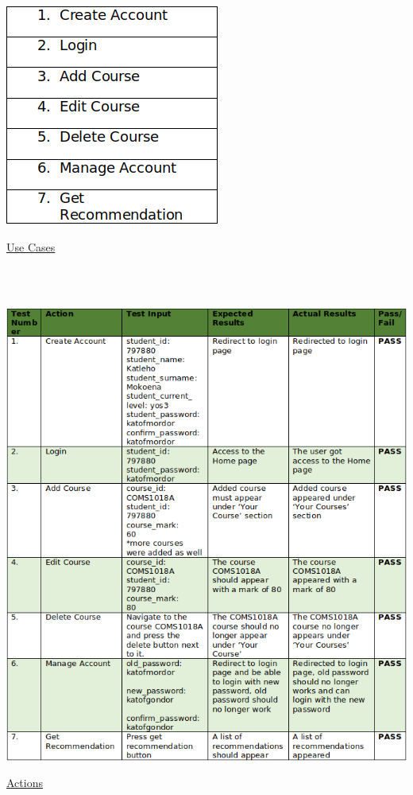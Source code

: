 \documentclass[10pt]{article}
\begin{document}
\begin{center}
\includegraphics[width=.6\textwidth]{methodology.png}
\end{center}
\caption{\underline{Use Cases}} \\ \\

\begin{center}
\includegraphics[width=.9\textwidth]{tester.png}
\end{center}
\caption{\underline{Actions}} \\ \\
\end{document}
